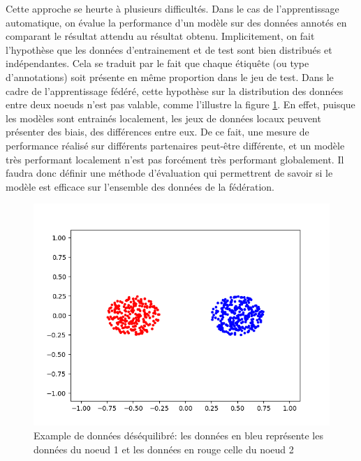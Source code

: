 \documentclass[stage3a]{tnreport} %
\begin{document}
Cette approche se heurte à plusieurs difficultés. Dans le cas de l'apprentissage automatique, on évalue la performance d'un modèle sur des données annotés en comparant le résultat attendu au résultat obtenu. Implicitement, on fait l'hypothèse que les données d'entrainement et de test sont bien distribués et indépendantes. Cela se traduit par le fait que chaque étiquête (ou type d'annotations) soit présente en même proportion dans le jeu de test. Dans le cadre de l'apprentissage fédéré, cette hypothèse sur la distribution des données entre deux noeuds n'est pas valable, comme l'illustre la figure \ref{fig:unballanced_data}. En effet, puisque les modèles sont entrainés localement, les jeux de données locaux peuvent présenter des biais, des différences entre eux. De ce fait, une mesure de performance réalisé sur différents partenaires peut-être différente, et un modèle très performant localement n'est pas forcément très performant globalement. Il faudra donc définir une méthode d'évaluation qui permettrent de savoir si le modèle est efficace sur l'ensemble des données de la fédération.


\begin{figure}[H]
  \centering
  \includegraphics[scale=0.8]{figures/repart_red_blue.png}
  \caption{Example de données déséquilibré: les données en bleu représente les données du noeud 1 et les données en rouge celle du noeud 2}
  \label{fig:unballanced_data}
\end{figure}
\end{document}

